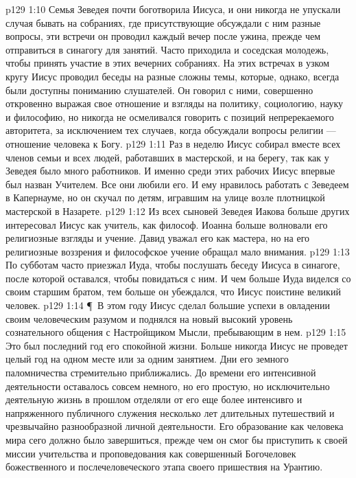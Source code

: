 \vs p129 1:10 Семья Зеведея почти боготворила Иисуса, и они никогда не упускали случая бывать на собраниях, где присутствующие обсуждали с ним разные вопросы, эти встречи он проводил каждый вечер после ужина, прежде чем отправиться в синагогу для занятий. Часто приходила и соседская молодежь, чтобы принять участие в этих вечерних собраниях. На этих встречах в узком кругу Иисус проводил беседы на разные сложны темы, которые, однако, всегда были доступны пониманию слушателей. Он говорил с ними, совершенно откровенно выражая свое отношение и взгляды на политику, социологию, науку и философию, но никогда не осмеливался говорить с позиций непререкаемого авторитета, за исключением тех случаев, когда обсуждали вопросы религии --- отношение человека к Богу.
\vs p129 1:11 Раз в неделю Иисус собирал вместе всех членов семьи и всех людей, работавших в мастерской, и на берегу, так как у Зеведея было много работников. И именно среди этих рабочих Иисус впервые был назван Учителем. Все они любили его. И ему нравилось работать с Зеведеем в Капернауме, но он скучал по детям, игравшим на улице возле плотницкой мастерской в Назарете.
\vs p129 1:12 Из всех сыновей Зеведея Иакова больше других интересовал Иисус как учитель, как философ. Иоанна больше волновали его религиозные взгляды и учение. Давид уважал его как мастера, но на его религиозные воззрения и философское учение обращал мало внимания.
\vs p129 1:13 По субботам часто приезжал Иуда, чтобы послушать беседу Иисуса в синагоге, после которой оставался, чтобы повидаться с ним. И чем больше Иуда виделся со своим старшим братом, тем больше он убеждался, что Иисус поистине великий человек.
\vs p129 1:14 \P\ В этом году Иисус сделал большие успехи в овладении своим человеческим разумом и поднялся на новый высокий уровень сознательного общения с Настройщиком Мысли, пребывающим в нем.
\vs p129 1:15 Это был последний год его спокойной жизни. Больше никогда Иисус не проведет целый год на одном месте или за одним занятием. Дни его земного паломничества стремительно приближались. До времени его интенсивной деятельности оставалось совсем немного, но его простую, но исключительно деятельную жизнь в прошлом отделяли от его еще более интенсивго и напряженного публичного служения несколько лет длительных путешествий и чрезвычайно разнообразной личной деятельности. Его образование как человека мира сего должно было завершиться, прежде чем он смог бы приступить к своей миссии учительства и проповедования как совершенный Богочеловек божественного и послечеловеческого этапа своего пришествия на Урантию.
